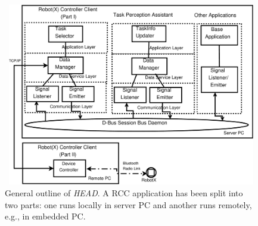 \documentclass{ifacconf}
\begin{document}
\begin{figure}
\begin{center}
\includegraphics[width=12cm,height=8cm]{./dia-files/concrete-arch} %
\caption{General outline of {\em HEAD}. A RCC application has been split into two parts: one runs locally in server PC and another runs remotely, e.g., in embedded PC.} 
\label{fig:concrete-arch}
\end{center}
\end{figure}
\end{document}
